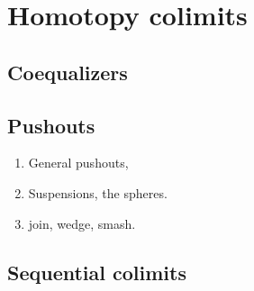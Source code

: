 \documentclass[11pt]{memoir} %
\begin{document}
\chapter{Homotopy colimits}

\section{Coequalizers}

\section{Pushouts}
\begin{enumerate}
\item General pushouts,
\item Suspensions, the spheres.
\item join, wedge, smash.
\end{enumerate}

\section{Sequential colimits}
\end{document}
